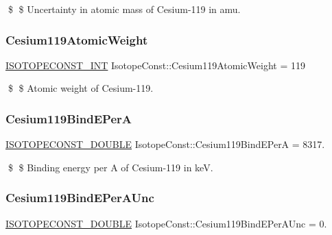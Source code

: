 \$ \$ Uncertainty in atomic mass of Cesium-\/119 in amu. \mbox{\label{group___isotope_const-_cesium-_cs119_ga0b008ffff6770b6f4bab918c4ec7151a}} 
\subsubsection{\texorpdfstring{Cesium119\+Atomic\+Weight}{Cesium119AtomicWeight}}
{\footnotesize\ttfamily \mbox{\hyperlink{group___isotope_const-_macros_ga5f18360b3e99483a35c32d789e62621c}{I\+S\+O\+T\+O\+P\+E\+C\+O\+N\+S\+T\+\_\+\+I\+NT}} Isotope\+Const\+::\+Cesium119\+Atomic\+Weight = 119}

\$ \$ Atomic weight of Cesium-\/119. \mbox{\label{group___isotope_const-_cesium-_cs119_gad8ed5ede4e3fd767030a13ec33bd7fa0}} 
\subsubsection{\texorpdfstring{Cesium119\+Bind\+E\+PerA}{Cesium119BindEPerA}}
{\footnotesize\ttfamily \mbox{\hyperlink{group___isotope_const-_macros_ga8f45a7272ce02c0b4c65c44636ed719a}{I\+S\+O\+T\+O\+P\+E\+C\+O\+N\+S\+T\+\_\+\+D\+O\+U\+B\+LE}} Isotope\+Const\+::\+Cesium119\+Bind\+E\+PerA = 8317.}

\$ \$ Binding energy per A of Cesium-\/119 in keV. \mbox{\label{group___isotope_const-_cesium-_cs119_ga3b82bec9c0c79e731acd34179ffb9cda}} 
\subsubsection{\texorpdfstring{Cesium119\+Bind\+E\+Per\+A\+Unc}{Cesium119BindEPerAUnc}}
{\footnotesize\ttfamily \mbox{\hyperlink{group___isotope_const-_macros_ga8f45a7272ce02c0b4c65c44636ed719a}{I\+S\+O\+T\+O\+P\+E\+C\+O\+N\+S\+T\+\_\+\+D\+O\+U\+B\+LE}} Isotope\+Const\+::\+Cesium119\+Bind\+E\+Per\+A\+Unc = 0.}

